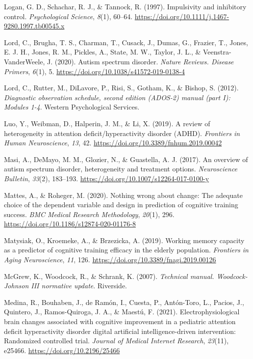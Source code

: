 \documentclass[
  letterpaper,
]{ut-thesis}
\newlength{\cslhangindent}
\newenvironment{CSLReferences}[2] %
 {\begin{list}{}{%
  \setlength{\itemindent}{0pt}
  \setlength{\leftmargin}{0pt}
  \setlength{\parsep}{0pt}
  \ifodd #1
   \setlength{\leftmargin}{\cslhangindent}
   \setlength{\itemindent}{-1\cslhangindent}
  \fi
  \setlength{\itemsep}{#2\baselineskip}}}
 {\end{list}}
\begin{document}
\begin{CSLReferences}{1}{0}
Logan, G. D., Schachar, R. J., \& Tannock, R. (1997). Impulsivity and
inhibitory control. \emph{Psychological Science}, \emph{8}(1), 60--64.
\url{https://doi.org/10.1111/j.1467-9280.1997.tb00545.x}

Lord, C., Brugha, T. S., Charman, T., Cusack, J., Dumas, G., Frazier,
T., Jones, E. J. H., Jones, R. M., Pickles, A., State, M. W., Taylor, J.
L., \& Veenstra-VanderWeele, J. (2020). Autism spectrum disorder.
\emph{Nature Reviews. Disease Primers}, \emph{6}(1), 5.
\url{https://doi.org/10.1038/s41572-019-0138-4}

Lord, C., Rutter, M., DiLavore, P., Risi, S., Gotham, K., \& Bishop, S.
(2012). \emph{Diagnostic observation schedule, second edition ({ADOS-2})
manual (part {I}): {Modules} 1-4}. Western Psychological Services.

Luo, Y., Weibman, D., Halperin, J. M., \& Li, X. (2019). A review of
heterogeneity in attention deficit/hyperactivity disorder ({ADHD}).
\emph{Frontiers in Human Neuroscience}, \emph{13}, 42.
\url{https://doi.org/10.3389/fnhum.2019.00042}

Masi, A., DeMayo, M. M., Glozier, N., \& Guastella, A. J. (2017). An
overview of autism spectrum disorder, heterogeneity and treatment
options. \emph{Neuroscience Bulletin}, \emph{33}(2), 183--193.
\url{https://doi.org/10.1007/s12264-017-0100-y}

Mattes, A., \& Roheger, M. (2020). Nothing wrong about change: The
adequate choice of the dependent variable and design in prediction of
cognitive training success. \emph{BMC Medical Research Methodology},
\emph{20}(1), 296. \url{https://doi.org/10.1186/s12874-020-01176-8}

Matysiak, O., Kroemeke, A., \& Brzezicka, A. (2019). Working memory
capacity as a predictor of cognitive training efficacy in the elderly
population. \emph{Frontiers in Aging Neuroscience}, \emph{11}, 126.
\url{https://doi.org/10.3389/fnagi.2019.00126}

McGrew, K., Woodcock, R., \& Schrank, K. (2007). \emph{Technical manual.
{Woodcock-Johnson III} normative update}. Riverside.

Medina, R., Bouhaben, J., de Ramón, I., Cuesta, P., Antón-Toro, L.,
Pacios, J., Quintero, J., Ramos-Quiroga, J. A., \& Maestú, F. (2021).
Electrophysiological brain changes associated with cognitive improvement
in a pediatric attention deficit hyperactivity disorder digital
artificial intelligence-driven intervention: {Randomized} controlled
trial. \emph{Journal of Medical Internet Research}, \emph{23}(11),
e25466. \url{https://doi.org/10.2196/25466}


\end{CSLReferences}
\end{document}
